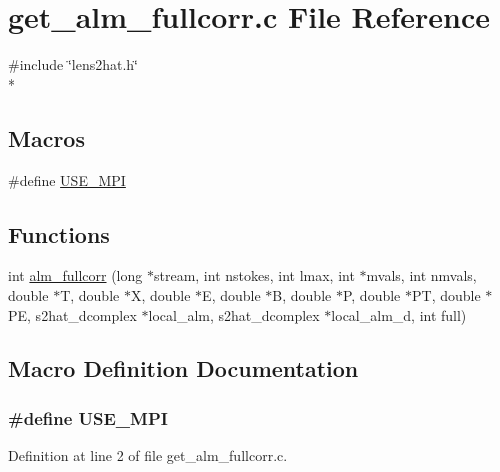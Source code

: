 \section{get\-\_\-alm\-\_\-fullcorr.\-c File Reference}
\label{get__alm__fullcorr_8c}
{\ttfamily \#include \char`\"{}lens2hat.\-h\char`\"{}}\\*
\subsection*{Macros}
\begin{DoxyCompactItemize}
\item 
\#define \hyperlink{get__alm__fullcorr_8c_a3869d282031f6ea6b50fdb980b758420}{U\-S\-E\-\_\-\-M\-P\-I}
\end{DoxyCompactItemize}
\subsection*{Functions}
\begin{DoxyCompactItemize}
\item 
int \hyperlink{get__alm__fullcorr_8c_a66df8465f1ae10f3699210532ca527e1}{alm\-\_\-fullcorr} (long $\ast$stream, int nstokes, int lmax, int $\ast$mvals, int nmvals, double $\ast$T, double $\ast$X, double $\ast$E, double $\ast$B, double $\ast$P, double $\ast$P\-T, double $\ast$P\-E, s2hat\-\_\-dcomplex $\ast$local\-\_\-alm, s2hat\-\_\-dcomplex $\ast$local\-\_\-alm\-\_\-d, int full)
\end{DoxyCompactItemize}


\subsection{Macro Definition Documentation}
\subsubsection[{U\-S\-E\-\_\-\-M\-P\-I}]{\setlength{\rightskip}{0pt plus 5cm}\#define U\-S\-E\-\_\-\-M\-P\-I}\label{get__alm__fullcorr_8c_a3869d282031f6ea6b50fdb980b758420}


Definition at line 2 of file get\-\_\-alm\-\_\-fullcorr.\-c.



